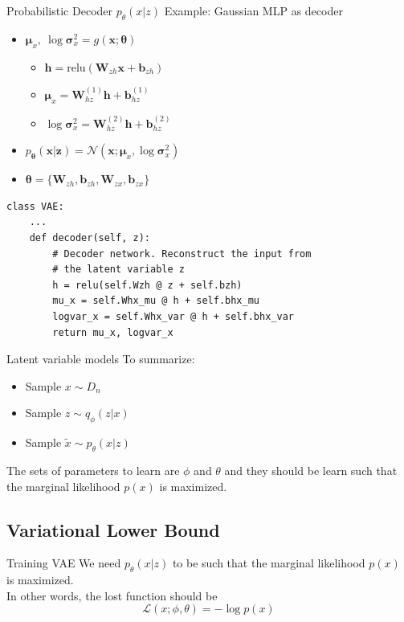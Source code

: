 \documentclass{beamer}
\newcommand{\relu}{\mathrm{relu}}
\begin{document}
\begin{frame}[fragile]{Probabilistic Decoder $p_\theta(x|z)$}
	Example: Gaussian MLP as decoder
	\begin{itemize}
		\item $\bm{\mu}_x,~\log\bm{\sigma}_x^2=g(\mathbf{x};\bm{\theta})$
		\begin{itemize}
			\item $\mathbf{h} = \relu\left(\mathbf{W}_{zh}\mathbf{x}+\mathbf{b}_{zh}\right)$
			\item $\bm{\mu}_x = \mathbf{W}^{(1)}_{hz}\mathbf{h}+\mathbf{b}^{(1)}_{hz}$
			\item $\log \bm{\sigma}_x^2 = \mathbf{W}^{(2)}_{hz}\mathbf{h}+\mathbf{b}^{(2)}_{hz}$
		\end{itemize}
		\item $p_{\bm{\theta}}(\mathbf{x}|\mathbf{z})=\mathcal{N}(\mathbf{x};\bm{\mu}_x, \log\bm{\sigma}_x^2)$
		\item $\bm{\theta} = \{\mathbf{W}_{zh}, \mathbf{b}_{zh}, \mathbf{W}_{zx}, \mathbf{b}_{zx}\}$
	\end{itemize}
\begin{verbatim}
class VAE:
    ...
    def decoder(self, z):
        # Decoder network. Reconstruct the input from 
        # the latent variable z
        h = relu(self.Wzh @ z + self.bzh)
        mu_x = self.Whx_mu @ h + self.bhx_mu
        logvar_x = self.Whx_var @ h + self.bhx_var
        return mu_x, logvar_x
\end{verbatim}
\end{frame}

\begin{frame}{Latent variable models}
	To summarize:
	\begin{itemize}
		\item Sample $x \sim D_n$
		\item Sample $z \sim q_\phi(z|x)$
		\item Sample $\tilde{x} \sim p_\theta(x|z)$
	\end{itemize}
	The sets of parameters to learn are $\phi$ and $\theta$ and they should be learn such that the marginal likelihood $p(x)$ is maximized.
\end{frame}

\subsection{Variational Lower Bound}

\begin{frame}{Training VAE}
	We need $p_\theta(x|z)$ to be such that the marginal likelihood $p(x)$ is maximized. \\
	
	In other words, the lost function should be
	\huge
	\[
		\mathcal{L}(x;\phi, \theta) = -\log p(x)	
	\]
\end{frame}
\end{document}
